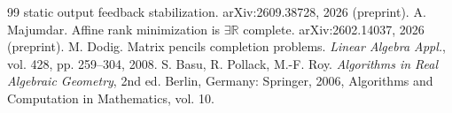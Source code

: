 \documentclass[journal]{IEEEtran}
\theoremstyle{plainn}
\begin{document}
\begin{thebibliography}{99}
  static output feedback stabilization. arXiv:2609.38728, 2026 (preprint).
 A. Majumdar. Affine rank minimization is
  $\exists\mathbb{R}$ complete. arXiv:2602.14037, 2026 (preprint).
 M. Dodig. Matrix pencils completion problems.
  \emph{Linear Algebra Appl.}, vol. 428, pp. 259--304, 2008.
 S. Basu, R. Pollack, M.-F. Roy. \emph{Algorithms in Real
  Algebraic Geometry}, 2nd ed. Berlin, Germany: Springer, 2006,
  Algorithms and Computation in Mathematics, vol. 10.
\end{thebibliography}
\end{document}
